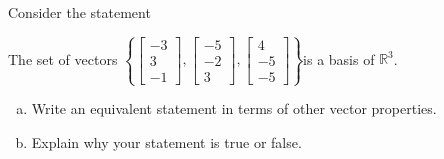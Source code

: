 
\begin{exerciseStatement}


Consider the statement 
\begin{center}\begin{minipage}{0.8\textwidth}
 The set of vectors \( \left\{ \left[\begin{array}{c}
-3 \\
3 \\
-1
\end{array}\right] , \left[\begin{array}{c}
-5 \\
-2 \\
3
\end{array}\right] , \left[\begin{array}{c}
4 \\
-5 \\
-5
\end{array}\right] \right\} \)is a basis of \(\mathbb{R}^3\). 
\end{minipage}\end{center}
    


\begin{enumerate}[(a)]
\item  Write an equivalent statement in terms of other vector properties.
\item  Explain why your statement is true or false.
\end{enumerate}
    
\end{exerciseStatement}
    
